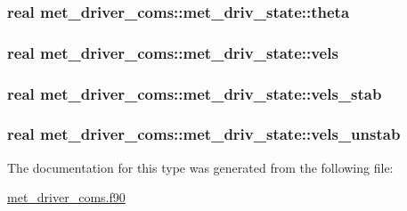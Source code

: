 \subsubsection[{\texorpdfstring{theta}{theta}}]{\setlength{\rightskip}{0pt plus 5cm}real met\+\_\+driver\+\_\+coms\+::met\+\_\+driv\+\_\+state\+::theta}\hypertarget{structmet__driver__coms_1_1met__driv__state_a0c7da64fc0aa6f6d0a87a7722a4bfcf6}{}\label{structmet__driver__coms_1_1met__driv__state_a0c7da64fc0aa6f6d0a87a7722a4bfcf6}
\subsubsection[{\texorpdfstring{vels}{vels}}]{\setlength{\rightskip}{0pt plus 5cm}real met\+\_\+driver\+\_\+coms\+::met\+\_\+driv\+\_\+state\+::vels}\hypertarget{structmet__driver__coms_1_1met__driv__state_a2f1468290cf4c5191ff3305516f403b4}{}\label{structmet__driver__coms_1_1met__driv__state_a2f1468290cf4c5191ff3305516f403b4}
\subsubsection[{\texorpdfstring{vels\+\_\+stab}{vels_stab}}]{\setlength{\rightskip}{0pt plus 5cm}real met\+\_\+driver\+\_\+coms\+::met\+\_\+driv\+\_\+state\+::vels\+\_\+stab}\hypertarget{structmet__driver__coms_1_1met__driv__state_aea2f12c370f025cc899515c9043dbdb9}{}\label{structmet__driver__coms_1_1met__driv__state_aea2f12c370f025cc899515c9043dbdb9}
\subsubsection[{\texorpdfstring{vels\+\_\+unstab}{vels_unstab}}]{\setlength{\rightskip}{0pt plus 5cm}real met\+\_\+driver\+\_\+coms\+::met\+\_\+driv\+\_\+state\+::vels\+\_\+unstab}\hypertarget{structmet__driver__coms_1_1met__driv__state_a5237ae89349cfee1060065ed728b8bb1}{}\label{structmet__driver__coms_1_1met__driv__state_a5237ae89349cfee1060065ed728b8bb1}


The documentation for this type was generated from the following file\+:\begin{DoxyCompactItemize}
\item 
\hyperlink{met__driver__coms_8f90}{met\+\_\+driver\+\_\+coms.\+f90}\end{DoxyCompactItemize}
